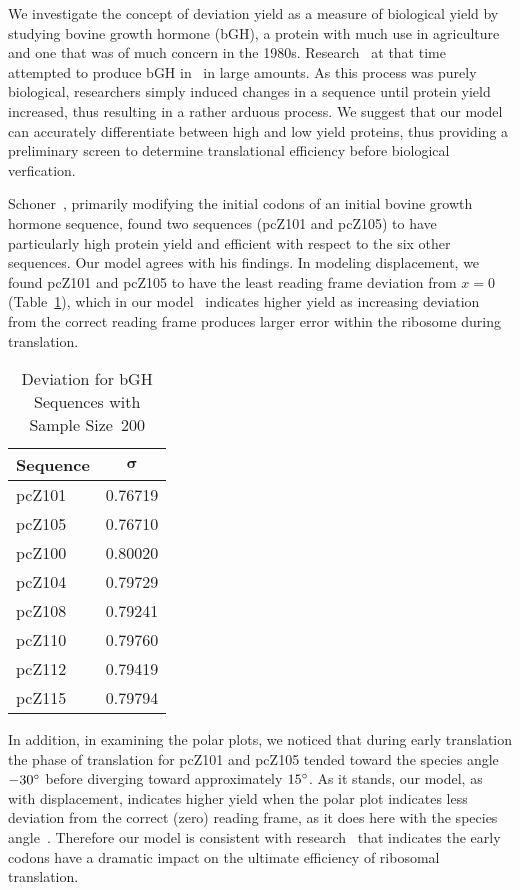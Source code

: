 \documentclass[12pt, draft]{article}
\numberwithin{equation}{section}
\begin{document}
We investigate the concept of deviation yield as a measure of biological
yield by studying bovine growth hormone (bGH), a protein with much use in agriculture
and one that was of much concern in the 1980s.
Research~\cite{schoner:bgh} at that time attempted to produce bGH
in \ecoli\ in large amounts.  As this process was purely biological, researchers
simply induced changes in a sequence until protein yield increased, thus resulting
in a rather arduous process.  We suggest that our model can accurately
differentiate between high and low yield proteins, thus providing a preliminary screen
to determine translational efficiency before biological verfication.

Schoner~\cite{schoner:bgh}, primarily modifying the initial codons of an initial
bovine growth hormone sequence, found two sequences (pcZ101 and pcZ105)
to have particularly high protein yield and efficient with respect to
the six other sequences. Our model agrees with his findings. In modeling displacement,
we found pcZ101 and pcZ105 to have the least reading frame deviation
from $x = 0$ (Table~\ref{bgh:deviation}), which in our model~\cite{lalit:mechanics} indicates
higher yield as increasing deviation from the correct reading frame
produces larger error within the ribosome during translation.

\begin{table}[tbp]
\begin{center}
    \begin{tabular}{lc}
        \toprule
        \textbf{Sequence} & $\mathbf{\sigma}$\\
        \midrule
        pcZ101 & 0.76719\\
        pcZ105 & 0.76710\\
        \midrule
        pcZ100 & 0.80020\\
        pcZ104 & 0.79729\\
        pcZ108 & 0.79241\\
        pcZ110 & 0.79760\\
        pcZ112 & 0.79419\\
        pcZ115 & 0.79794\\
        \bottomrule
    \end{tabular}
    \caption{Deviation for bGH Sequences with Sample Size~200}
    \label{bgh:deviation}
\end{center}
\end{table}

In addition, in examining the polar plots, we noticed that during
early translation the phase of translation for pcZ101 and pcZ105 tended toward the species
angle $-30^\circ$ before diverging toward approximately $15^\circ$. As
it stands, our model, as with displacement, indicates higher yield when the polar plot
indicates less deviation from the correct (zero) reading frame, as it
does here with the species angle~\cite{lalit:mechanics}. Therefore our
model is consistent with research~\cite{bgh:initiation} that indicates
the early codons have a dramatic impact on the ultimate efficiency of
ribosomal translation.
\end{document}
